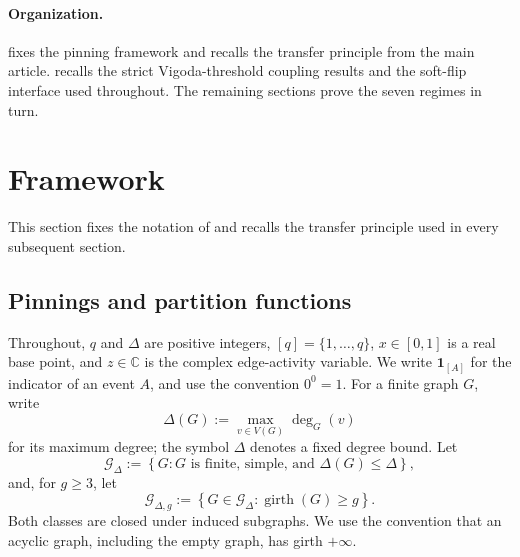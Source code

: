 \documentclass[11pt,reqno]{article}
\theoremstyle{plain}
\theoremstyle{definition}
\theoremstyle{remark}
\newcommand{\C}{\mathbb{C}}
\newcommand{\set}[1]{\left\{#1\right\}}
\newcommand{\one}[1]{\mathbf{1}_{\left[#1\right]}}   %
\newcommand{\Deg}{\Delta}                        %
\newcommand{\colours}{[q]}                        %
\newcommand{\Gdeg}{\mathcal{G}_{\Deg}}
\newcommand{\Gdegg}[1]{\mathcal{G}_{\Deg,#1}}
\begin{document}
\paragraph{Organization.}
 fixes the pinning framework and recalls the
transfer principle from the main article.
 recalls the strict Vigoda-threshold coupling
results and the soft-flip interface used throughout.
The remaining sections prove the seven regimes in turn.

\section{Framework}
\label{sec:potts-setup}

This section fixes the notation of \cite{ShaoShi2026CI2ZF} and recalls
the transfer principle used in every subsequent section.

\subsection{Pinnings and partition functions}

Throughout, \(q\) and \(\Deg\) are positive integers,
\(\colours=\{1,\ldots,q\}\), \(x\in[0,1]\) is a real base point, and
\(z\in\C\) is the complex edge-activity variable.  We write \(\one{A}\)
for the indicator of an event \(A\), and use the convention \(0^0=1\).
For a finite graph \(G\), write
\[
  \Delta(G):=\max_{v\in V(G)}\deg_G(v)
\]
for its maximum degree; the symbol \(\Deg\) denotes a fixed degree bound.
Let
\[
  \Gdeg:=\set{G:\text{$G$ is finite, simple, and }\Delta(G)\le\Deg},
\]
and, for \(g\ge3\), let
\[
  \Gdegg{g}:=\set{G\in\Gdeg:\operatorname{girth}(G)\ge g}.
\]
Both classes are closed under induced subgraphs.  We use the convention that
an acyclic graph, including the empty graph, has girth \(+\infty\).
\end{document}
